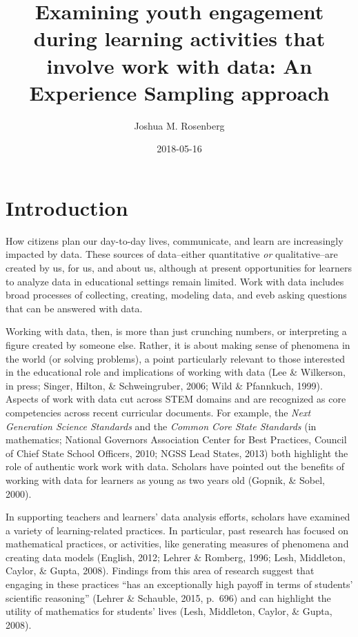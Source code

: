 \documentclass[]{book}
\title{Examining youth engagement during learning activities that involve work
with data: An Experience Sampling approach}
\author{Joshua M. Rosenberg}
\date{2018-05-16}
\theoremstyle{definition}
\theoremstyle{definition}
\theoremstyle{definition}
\theoremstyle{remark}
\begin{document}
\maketitle

{
\setcounter{tocdepth}{1}
\tableofcontents
}
\chapter{Introduction}\label{intro-placemarker}

How citizens plan our day-to-day lives, communicate, and learn are
increasingly impacted by data. These sources of data--either
quantitative \emph{or} qualitative--are created by us, for us, and about
us, although at present opportunities for learners to analyze data in
educational settings remain limited. Work with data includes broad
processes of collecting, creating, modeling data, and eveb asking
questions that can be answered with data.

Working with data, then, is more than just crunching numbers, or
interpreting a figure created by someone else. Rather, it is about
making sense of phenomena in the world (or solving problems), a point
particularly relevant to those interested in the educational role and
implications of working with data (Lee \& Wilkerson, in press; Singer,
Hilton, \& Schweingruber, 2006; Wild \& Pfannkuch, 1999). Aspects of
work with data cut across STEM domains and are recognized as core
competencies across recent curricular documents. For example, the
\emph{Next Generation Science Standards} and the \emph{Common Core State
Standards} (in mathematics; National Governors Association Center for
Best Practices, Council of Chief State School Officers, 2010; NGSS Lead
States, 2013) both highlight the role of authentic work work with data.
Scholars have pointed out the benefits of working with data for learners
as young as two years old (Gopnik, \& Sobel, 2000).

In supporting teachers and learners' data analysis efforts, scholars
have examined a variety of learning-related practices. In particular,
past research has focused on mathematical practices, or activities, like
generating measures of phenomena and creating data models (English,
2012; Lehrer \& Romberg, 1996; Lesh, Middleton, Caylor, \& Gupta, 2008).
Findings from this area of research suggest that engaging in these
practices ``has an exceptionally high payoff in terms of students'
scientific reasoning'' (Lehrer \& Schauble, 2015, p.~696) and can
highlight the utility of mathematics for students' lives (Lesh,
Middleton, Caylor, \& Gupta, 2008).
\end{document}
